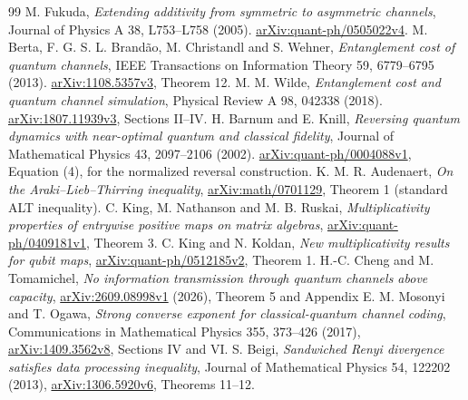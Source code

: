 \documentclass[11pt]{article}
\begin{document}
\begin{thebibliography}{99}
 M. Fukuda, \emph{Extending additivity from symmetric to asymmetric channels}, Journal of Physics A 38, L753--L758 (2005). \href{https://arxiv.org/abs/quant-ph/0505022}{arXiv:quant-ph/0505022v4}.
 M. Berta, F. G. S. L. Brand\~ao, M. Christandl and S. Wehner, \emph{Entanglement cost of quantum channels}, IEEE Transactions on Information Theory 59, 6779--6795 (2013). \href{https://arxiv.org/abs/1108.5357v3}{arXiv:1108.5357v3}, Theorem 12.
 M. M. Wilde, \emph{Entanglement cost and quantum channel simulation}, Physical Review A 98, 042338 (2018). \href{https://arxiv.org/abs/1807.11939v3}{arXiv:1807.11939v3}, Sections II--IV.
 H. Barnum and E. Knill, \emph{Reversing quantum dynamics with near-optimal quantum and classical fidelity}, Journal of Mathematical Physics 43, 2097--2106 (2002). \href{https://arxiv.org/abs/quant-ph/0004088v1}{arXiv:quant-ph/0004088v1}, Equation (4), for the normalized reversal construction.
 K. M. R. Audenaert, \emph{On the Araki--Lieb--Thirring inequality}, \href{https://arxiv.org/abs/math/0701129}{arXiv:math/0701129}, Theorem 1 (standard ALT inequality).
 C. King, M. Nathanson and M. B. Ruskai, \emph{Multiplicativity properties of entrywise positive maps on matrix algebras}, \href{https://arxiv.org/abs/quant-ph/0409181v1}{arXiv:quant-ph/0409181v1}, Theorem 3.
 C. King and N. Koldan, \emph{New multiplicativity results for qubit maps}, \href{https://arxiv.org/abs/quant-ph/0512185v2}{arXiv:quant-ph/0512185v2}, Theorem 1.
 H.-C. Cheng and M. Tomamichel, \emph{No information transmission through quantum channels above capacity}, \href{https://arxiv.org/abs/2609.08998v1}{arXiv:2609.08998v1} (2026), Theorem 5 and Appendix E.
 M. Mosonyi and T. Ogawa, \emph{Strong converse exponent for classical-quantum channel coding}, Communications in Mathematical Physics 355, 373--426 (2017), \href{https://arxiv.org/abs/1409.3562v8}{arXiv:1409.3562v8}, Sections IV and VI.
 S. Beigi, \emph{Sandwiched Renyi divergence satisfies data processing inequality}, Journal of Mathematical Physics 54, 122202 (2013), \href{https://arxiv.org/abs/1306.5920v6}{arXiv:1306.5920v6}, Theorems 11--12.
\end{thebibliography}
\end{document}
